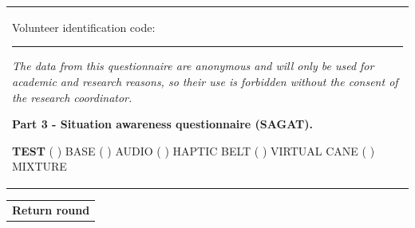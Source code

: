 \begin{table}[!htb]
    \centering
    \begin{tabular}{m{1\linewidth}}

        {\color{gray}

        Volunteer identification code: \rule{1in}{.2mm}
        
        \textit{The data from this questionnaire are anonymous and will only be used for academic and research reasons, so their use is forbidden without the consent of the research coordinator.}
        }
        
        \begin{center}
        \textbf{Part 3 - Situation awareness questionnaire (SAGAT).}
        \end{center}
        
        \noindent
        \textbf{TEST} ( ) BASE \hfill ( ) AUDIO \hfill ( ) HAPTIC BELT \hfill ( ) VIRTUAL CANE \hfill ( ) MIXTURE
        
    \end{tabular}

    \centering
    \begin{tabular}{m{1\linewidth}}
        \textbf{Return round}
    \end{tabular}

\hspace{0.5cm}

%


\end{table}
